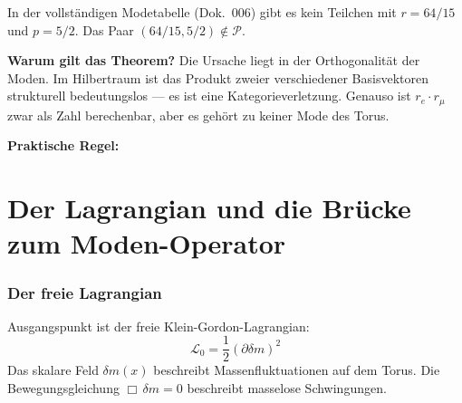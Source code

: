 In der vollständigen Modetabelle (Dok.~006) gibt es kein Teilchen
mit $r = 64/15$ und $p = 5/2$. Das Paar $(64/15, 5/2) \notin \mathcal{P}$.

\textbf{Warum gilt das Theorem?} Die Ursache liegt in der
Orthogonalität der Moden. Im Hilbertraum ist das Produkt zweier
verschiedener Basisvektoren strukturell bedeutungslos — es ist eine
Kategorieverletzung. Genauso ist $r_e \cdot r_\mu$ zwar als Zahl
berechenbar, aber es gehört zu keiner Mode des Torus.

\textbf{Praktische Regel:}

\begin{center}
{\footnotesize
{}
}
\end{center}

\part{Der Lagrangian und die Brücke zum Moden-Operator}

\section{Der freie Lagrangian}

Ausgangspunkt ist der freie Klein-Gordon-Lagrangian:
\begin{equation}
  \mathcal{L}_0 = \frac{1}{2}(\partial\delta m)^2
\end{equation}
Das skalare Feld $\delta m(x)$ beschreibt Massenfluktuationen auf dem Torus.
Die Bewegungsgleichung $\Box\,\delta m = 0$ beschreibt masselose Schwingungen.

